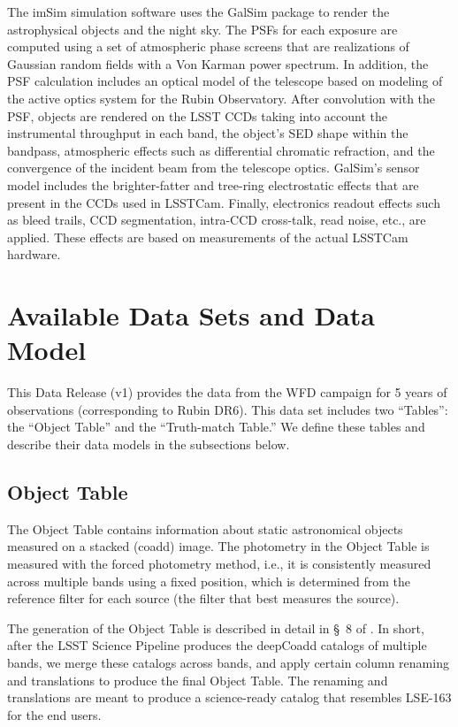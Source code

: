 \documentclass[11pt]{report}
\begin{document}
The imSim simulation software uses the GalSim package \citep{2015A&C....10..121R} to render the astrophysical objects and the night sky.  The PSFs for each exposure are computed using a set of atmospheric phase screens that are realizations of Gaussian random fields with a Von Karman power spectrum.  In addition, the PSF calculation includes an optical model of the telescope based on modeling of the active optics system for the Rubin Observatory.  After convolution with the PSF, objects are rendered on the LSST CCDs taking into account the instrumental throughput in each band, the object's SED shape within the bandpass, atmospheric effects such as differential chromatic refraction, and the convergence of the incident beam from the telescope optics. GalSim's sensor model includes the brighter-fatter and tree-ring electrostatic effects that are present in the CCDs used in LSSTCam.  Finally, electronics readout effects such as bleed trails, CCD segmentation, intra-CCD cross-talk, read noise, etc., are applied.  These effects are based on measurements of the actual LSSTCam hardware.


\section{Available Data Sets and Data Model}
\label{sec:products}

This Data Release (v1) provides the data from the WFD campaign for 5 years of observations (corresponding to Rubin DR6). This data set includes two ``Tables'': the ``Object Table'' and the ``Truth-match Table.'' We define these tables and describe their data models in the subsections below. 

\subsection{Object Table}
\label{sec:object}

The Object Table contains information about static astronomical objects measured on a stacked (coadd) image. The photometry in the Object Table is measured with the forced photometry method, i.e., it is consistently measured across multiple bands using a fixed position, which is determined from the reference filter for each source (the filter that best measures the source). 

The generation of the Object Table is described in detail in \S~8 of \cite{2020arXiv201005926L}. In short, after the LSST Science Pipeline produces the deepCoadd catalogs of multiple bands, we merge these catalogs across bands, and apply certain column renaming and translations to produce the final Object Table. The renaming and translations are meant to produce a science-ready catalog that resembles LSE-163 for the end users. 
\end{document}
